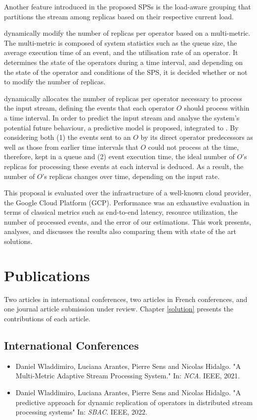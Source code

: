 Another feature introduced in the proposed SPSs is the load-aware grouping that partitions the stream among replicas based on their respective current load.

\rSPS{} dynamically modify the number of replicas per operator based on a multi-metric. The multi-metric is composed of system statistics such as the queue size, the average execution time of an event, and the utilisation rate of an operator. It determines the state of the operators during a time interval, and depending on the state of the operator and conditions of the SPS, it is decided whether or not to modify the number of replicas.

\pSPS{} dynamically allocates the number of replicas per operator necessary to process the input stream, defining the events that each operator $O$ should process within a time interval. In order to predict the input stream and analyse the system's potential future behaviour, a predictive model is proposed, integrated to \pSPS{}. By considering both (1) the events sent to an $O$ by its direct operator predecessors as well as those from earlier time intervals that $O$ could not process at the time,  therefore, kept in a queue and (2) event execution time, the ideal number of $O$'s replicas for processing these events at each interval is deduced. As a result, the number of $O$'s replicas changes over time, depending on the input rate.

This proposal is evaluated over the infrastructure of a well-known cloud provider, the Google Cloud Platform (GCP).  Performance was an exhaustive evaluation in terms of classical metrics such as end-to-end latency, resource utilization, the number of processed events, and the error of our estimations. This work presents, analyses, and discusses the results also comparing them with state of the art solutions. 

\section{Publications}
\label{publications}

Two articles in international conferences, two articles in French conferences, and one journal article submission under review. Chapter \ref{solution} presents the contributions of each article.

\subsection{International Conferences}
\begin{itemize}
	\item \cite{WladdimiroNCA} Daniel Wladdimiro, Luciana Arantes, Pierre Sens and Nicolas Hidalgo. "A Multi-Metric Adaptive Stream Processing System." In: \textit{NCA}. IEEE, 2021.
	\item \cite{WladdimiroSBAC} Daniel Wladdimiro, Luciana Arantes, Pierre Sens and Nicolas Hidalgo. "A predictive approach for dynamic replication of operators in distributed stream processing systems" In: \textit{SBAC}. IEEE, 2022.
\end{itemize}

